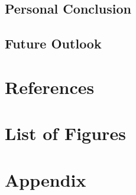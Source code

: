 \documentclass[11pt, a4paper, oneside, draft]{scrartcl}
\begin{document}
        \subsection{Personal Conclusion}

        \subsection{Future Outlook}

    \section*{References}
        \printbibliography[heading=none]

    \section*{List of Figures}
        \begingroup
            \renewcommand{\listfigurename}{} %
            \listoffigures
        \endgroup

    \section*{Appendix}
\end{document}
